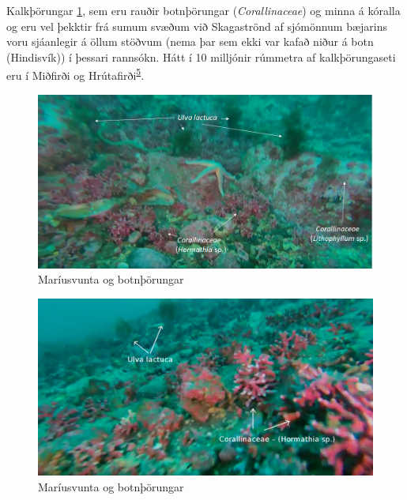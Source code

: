 \documentclass[icelandic,]{book}
\begin{document}
Kalkþörungar \ref{fig:tharitveir}, sem eru rauðir botnþörungar (\emph{Corallinaceae}) og minna á kóralla og eru vel þekktir frá sumum svæðum við Skagaströnd af sjómönnum bæjarins voru sjáanlegir á öllum stöðvum (nema þar sem ekki var kafað niður á botn (Hindisvík)) í þessari rannsókn. Hátt í 10 milljónir rúmmetra af kalkþörungaseti eru í Miðfirði og Hrútafirði\textsuperscript{\protect\hyperlink{ref-thors}{5}}.

\begin{figure}

{\centering \includegraphics[width=1\linewidth]{myndir/bettina/Ulva_Corallinaceae_two_species} 

}

\caption{Maríusvunta og botnþörungar}\label{fig:tharitveir}
\end{figure}

\begin{figure}

{\centering \includegraphics[width=1\linewidth]{myndir/bettina/fleirikorallarogulva} 

}

\caption{Maríusvunta og botnþörungar}\label{fig:tharithrir}
\end{figure}
\end{document}
